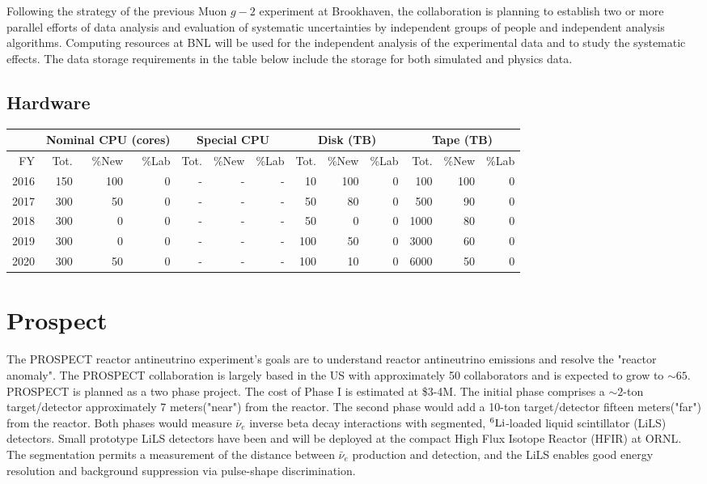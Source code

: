 \documentclass[pdftex,12pt,letter]{article}
\begin{document}
Following the strategy of the previous Muon $g-2$ experiment at Brookhaven, the collaboration is planning to establish two or more parallel efforts of data analysis and evaluation of systematic uncertainties by independent groups of people and independent analysis algorithms. 
Computing resources at BNL will be used for the independent analysis of the experimental data and to study the systematic effects. 
The data storage requirements in the table below include the storage for both simulated and physics data. 

\subsection{Hardware}

\begin{tabular}[h]{|r || r|r|r || r|r|r || r|r|r || r|r|r ||}
  \hline
   & \multicolumn{3}{c||}{Nominal CPU (cores)} & \multicolumn{3}{c||}{Special CPU} & \multicolumn{3}{c||}{Disk (TB)} & \multicolumn{3}{c||}{Tape (TB)} \\
   \hline
  FY & Tot. & \%New & \%Lab & Tot. & \%New & \%Lab & Tot. & \%New & \%Lab & Tot. & \%New & \%Lab \\
  \hline
  2016 & 150 & 100 &  0& - &- &- & 10 & 100 & 0& 100 &  100 & 0\\
  \hline
  2017 & 300 &  50  & 0& - &- &- &  50 &  80    &0 & 500 &   90 & 0\\
  \hline
  2018 & 300 &   0   & 0& - &- &- &  50 & 0      &0 & 1000 &   80 & 0\\
  \hline
  2019 & 300 &   0   & 0& - &- &- & 100 & 50     &0 & 3000 &   60 & 0\\
  \hline
  2020 & 300 &  50  &  0&-  &- &- & 100 &  10    &0 & 6000 &   50 & 0\\
  \hline
\end{tabular}

\pagebreak
\section{Prospect}

The PROSPECT reactor antineutrino experiment's goals are to understand
reactor antineutrino emissions and resolve the "reactor anomaly". The
PROSPECT collaboration is largely based in the US with approximately
50 collaborators and is expected to grow to $\sim\!65$. 
PROSPECT is planned as a two phase project. The cost of Phase I is
estimated at \$3-4M.  
The initial phase comprises a $\sim\!2$-ton target/detector
approximately 7 meters("near") from the reactor. 
The second phase would add a 10-ton target/detector fifteen
meters("far") from the reactor.
Both phases would measure $\bar\nu_e$ inverse beta decay interactions
with segmented, ${}^6{\rm Li}$-loaded liquid scintillator (LiLS)
detectors. Small prototype LiLS detectors have been and will be
deployed at the compact High Flux Isotope Reactor (HFIR) at ORNL. 
The segmentation permits a measurement of the distance between
$\bar\nu_e$ production and detection, and the LiLS enables good energy
resolution and background suppression via pulse-shape discrimination.
\end{document}
